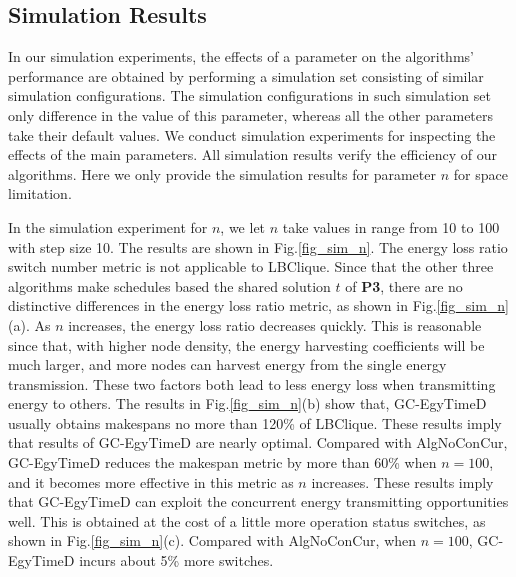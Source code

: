 \documentclass[journal,10pt]{IEEEtran}
\begin{document}
\subsection{Simulation Results}

In our simulation experiments, the effects of a parameter on the algorithms' performance are obtained by performing a simulation set consisting of similar simulation configurations. The simulation configurations in such simulation set only difference in the value of this parameter, whereas all the other parameters take their default values. We conduct simulation experiments for inspecting the effects of the main parameters. All simulation results verify the efficiency of our algorithms. Here we only provide the simulation results for parameter $n$ for space limitation.

In the simulation experiment for $n$, we let $n$ take values in range from 10 to 100 with step size 10. The results are shown in Fig.\ref{fig_sim_n}. The energy loss ratio switch number metric is not applicable to LBClique. Since that the other three algorithms make schedules based the shared solution $t$ of \textbf{P3}, there are no distinctive differences in the energy loss ratio metric, as shown in Fig.\ref{fig_sim_n}(a). As $n$ increases, the energy loss ratio decreases quickly. This is reasonable since that, with higher node density, the energy harvesting coefficients will be much larger, and more nodes can harvest energy from the single energy transmission. These two factors both lead to less energy loss when transmitting energy to others. The results in Fig.\ref{fig_sim_n}(b) show that, GC-EgyTimeD usually obtains makespans no more than 120\% of LBClique. These results imply that results of GC-EgyTimeD are nearly optimal. Compared with AlgNoConCur, GC-EgyTimeD reduces the makespan metric by more than 60\% when $n{=}100$, and it becomes more effective in this metric as $n$ increases. These results imply that GC-EgyTimeD can exploit the concurrent energy transmitting opportunities well. This is obtained at the cost of a little more operation status switches, as shown in Fig.\ref{fig_sim_n}(c). Compared with AlgNoConCur, when $n{=}100$, GC-EgyTimeD incurs about 5\% more switches.
\end{document}
